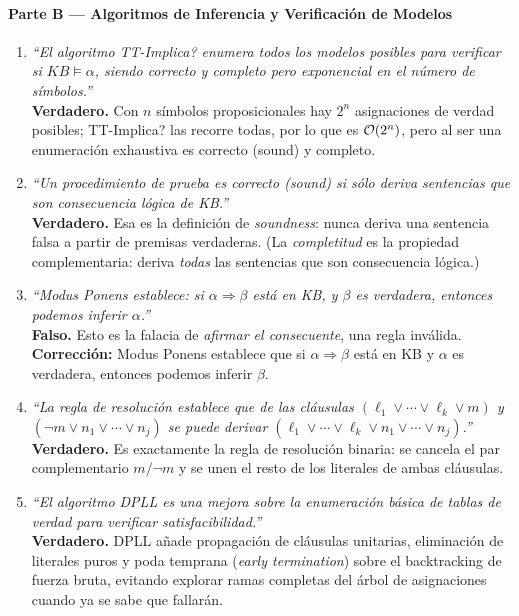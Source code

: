 \paragraph{Parte B --- Algoritmos de Inferencia y Verificación de Modelos}

\begin{enumerate}
    \item \textit{``El algoritmo TT-Implica? enumera todos los modelos posibles para verificar si
    $KB \models \alpha$, siendo correcto y completo pero exponencial en el número de símbolos.''}\\
    \textbf{Verdadero.} Con $n$ símbolos proposicionales hay $2^n$ asignaciones de verdad posibles;
    TT-Implica? las recorre todas, por lo que es $\mathcal{O}(2^n)$, pero al ser una enumeración exhaustiva
    es correcto (sound) y completo.

    \item \textit{``Un procedimiento de prueba es correcto (sound) si sólo deriva sentencias que son
    consecuencia lógica de KB.''}\\
    \textbf{Verdadero.} Esa es la definición de \textit{soundness}: nunca deriva una sentencia falsa
    a partir de premisas verdaderas. (La \textit{completitud} es la propiedad complementaria: deriva
    \emph{todas} las sentencias que son consecuencia lógica.)

    \item \textit{``Modus Ponens establece: si $\alpha \Rightarrow \beta$ está en KB, y $\beta$ es
    verdadera, entonces podemos inferir $\alpha$.''}\\
    \textbf{Falso.} Esto es la falacia de \textit{afirmar el consecuente}, una regla inválida.\\
    \textbf{Corrección:} Modus Ponens establece que si $\alpha \Rightarrow \beta$ está en KB y
    $\alpha$ es verdadera, entonces podemos inferir $\beta$.

    \item \textit{``La regla de resolución establece que de las cláusulas $(\ell_1 \lor \cdots \lor
    \ell_k \lor m)$ y $(\neg m \lor n_1 \lor \cdots \lor n_j)$ se puede derivar $(\ell_1 \lor \cdots
    \lor \ell_k \lor n_1 \lor \cdots \lor n_j)$.''}\\
    \textbf{Verdadero.} Es exactamente la regla de resolución binaria: se cancela el par
    complementario $m / \neg m$ y se unen el resto de los literales de ambas cláusulas.

    \item \textit{``El algoritmo DPLL es una mejora sobre la enumeración básica de tablas de verdad
    para verificar satisfacibilidad.''}\\
    \textbf{Verdadero.} DPLL añade propagación de cláusulas unitarias, eliminación de literales puros
    y poda temprana (\textit{early termination}) sobre el backtracking de fuerza bruta, evitando
    explorar ramas completas del árbol de asignaciones cuando ya se sabe que fallarán.


\end{enumerate}

